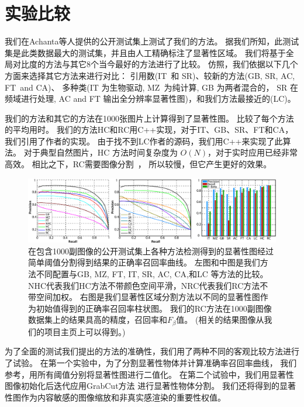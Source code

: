 \documentclass[final]{cvpr}
\newcommand{\IT}{IT\cite{98pami/Itti}}
\newcommand{\MZ}{MZ\cite{03ACMMM/Ma_Contrast-based}}
\newcommand{\GB}{GB\cite{conf/nips/HarelKP06}}
\newcommand{\SR}{SR\cite{07cvpr/hou_SpectralResidual}}
\newcommand{\FT}{FT\cite{09cvpr/Achanta_FTSaliency}}
\newcommand{\CA}{CA\cite{10cvpr/goferman_context}}
\newcommand{\LC}{LC\cite{06acmmm/ZhaiS_spatiotemporal}}
\newcommand{\AC}{AC\cite{08cvs/achanta_salient}}
\begin{document}
\section{实验比较}\label{sec:Experiment}


我们在Achanta等人提供的公开测试集\cite{09cvpr/Achanta_FTSaliency}上测试了我们的方法。
据我们所知，此测试集是此类数据最大的测试集，并且由人工精确标注了显著性区域。
我们将基于全局对比度的方法与其它$8$个当今最好的方法进行了比较。
仿照\cite{09cvpr/Achanta_FTSaliency}，我们依据以下几个方面来选择其它方法来进行对比：
引用数(\IT ~和 \SR)、较新的方法(\GB, SR, \AC, \FT ~and \CA)、
多种类(IT 为生物驱动, \MZ~为纯计算, GB 为两者混合的， SR 在频域进行处理,
AC and FT 输出全分辨率显著性图)，和我们方法最接近的(\LC)。


我们的方法和其它的方法在1000张图片上计算得到了显著性图。
 比较了每个方法的平均用时。
我们的方法HC和RC用C++实现，对于IT、GB、SR、FT和CA，我们引用了作者的实现。
由于找不到LC作者的源码，我们用C++来实现了此算法。
对于典型自然图片，HC 方法时间复杂度为 $O(N)$，对于实时应用已经非常高效。
相比之下，RC需要图像分割~\cite{04ijcv/felzenszwalb_efficient}，
所以较慢，但它产生更好的效果。

\begin{figure}[t]
  \centering
  \includegraphics[width=\textwidth]{plots.pdf}
  \caption{在包含1000副图像的公开测试集上各种方法检测得到的显著性图经过
      简单阈值分割得到结果的正确率召回率曲线。
      左图和中图是我们方法不同配置与\GB, \MZ,  \FT, \IT, \SR, \AC, \CA,和\LC
      等方法的比较。
      NHC代表我们HC方法不带颜色空间平滑，NRC代表我们RC方法不带空间加权。
      右图是我们显著性区域分割方法以不同的显著性图作为初始值得到的正确率召回率柱状图。
      我们的RC方法在1000副图像数据集上的结果具高的精度，召回率和$F_{\beta}$值。
      (相关的结果图像从我们的项目主页上可以得到。)
  } \label{fig:plots}
\end{figure}

为了全面的测试我们提出的方法的准确性，我们用了两种不同的客观比较方法进行了试验。
在第一个实验中，为了分割显著性物体并计算准确率召回率曲线，
我们参考\cite{09cvpr/Achanta_FTSaliency}，用所有阈值分别将显著性图进行二值化。
在第二个试验中，我们用显著性图像初始化后迭代应用GrabCut方法
\cite{04tog/rother_grabcut}进行显著性物体分割。
我们还将得到的显著性图作为内容敏感的图像缩放和非真实感渲染的重要性权值。
\end{document}
